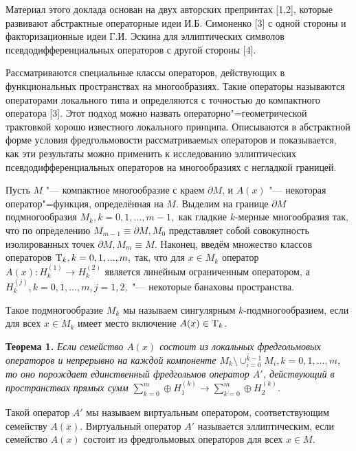 \vzmscaption

Материал этого доклада основан на двух авторских препринтах [1,2], которые развивают абстрактные операторные идеи И.Б. Симоненко [3] с одной стороны и факторизационные идеи Г.И. Эскина для эллиптических символов псевдодифференциальных операторов с другой стороны [4].

Рассматриваются специальные классы операторов, действующих в функциональных пространствах на многообразиях. Такие операторы называются операторами локального типа и определяются с точностью до компактного оператора [3]. Этот подход можно назвать операторно"=геометрической трактовкой хорошо известного локального принципа. Описываются в абстрактной форме условия фредгольмовости рассматриваемых операторов и показывается, как эти результаты можно применить к исследованию эллиптических псевдодифференциальных операторов на многообразиях с негладкой границей.

Пусть $M$ "--- компактное многообразие с краем $\partial M$, и $A(x)$ "--- некоторая оператор"=функция, определённая на $M$. Выделим на границе $\partial M$ подмногообразия $M_k, k=0,1,...,m-1,$ как гладкие $k$-мерные многообразия так, что по определению $M_{m-1}\equiv\partial M, M_0$ представляет собой совокупность изолированных точек $\partial M, M_m\equiv M$. Наконец, введём множество классов операторов ${\rm T}_k, k=0,1,...,m,$ так, что для $x\in M_k$ оператор $A(x): H^{(1)}_k\rightarrow H^{(2)}_k$ является линейным ограниченным оператором, а $H^{(j)}_k, k=0,1,...,m, j=1,2,$ "--- некоторые банаховы пространства.


Такое подмногообразие $M_k$ мы называем сингулярным $k$-подмногообразием, если для всех $x\in M_k$ имеет место включение $A(x)\in{\rm T}_k$.

\textbf{Теорема 1.} {\it
Если семейство $A(x)$ состоит из локальных фредгольмовых операторов и непрерывно на каждой компоненте $\overline{M_k\setminus\cup_{i=0}^{k-1}M_i}, k=0,1,...,m,$ то оно порождает единственный фредгольмов оператор
$A'$, действующий в пространствах прямых сумм $\sum\limits_{k=0}^m\oplus H^{(k)}_1\rightarrow\sum\limits_{k=0}^m\oplus H^{(k)}_2$.
}


Такой оператор $A'$ мы называем виртуальным оператором, соответствующим семейству $A(x)$. Виртуальный оператор $A'$ называется эллиптическим, если семейство $A(x)$ состоит из фредгольмовых операторов для всех $x\in M$.

